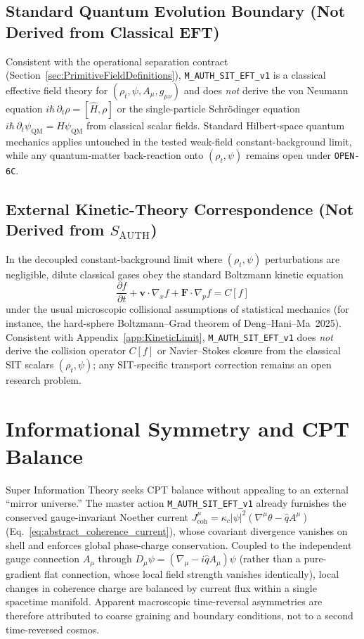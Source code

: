 \subsection{Standard Quantum Evolution Boundary (Not Derived from Classical EFT)}

Consistent with the operational separation contract (Section~\ref{sec:PrimitiveFieldDefinitions}), \texttt{M\_AUTH\_SIT\_EFT\_v1} is a classical effective field theory for $(\rho_t, \psi, A_\mu, g_{\mu\nu})$ and does \emph{not} derive the von Neumann equation $i\hbar\,\partial_t\rho = [\hat{H}, \rho]$ or the single-particle Schr\"odinger equation $i\hbar\,\partial_t\psi_{\mathrm{QM}} = \hat{H}\psi_{\mathrm{QM}}$ from classical scalar fields. Standard Hilbert-space quantum mechanics applies untouched in the tested weak-field constant-background limit, while any quantum-matter back-reaction onto $(\rho_t, \psi)$ remains open under \texttt{OPEN-6C}.

\subsection{External Kinetic-Theory Correspondence (Not Derived from $S_{\mathrm{AUTH}}$)}

In the decoupled constant-background limit where $(\rho_t, \psi)$ perturbations are negligible, dilute classical gases obey the standard Boltzmann kinetic equation
\[
\frac{\partial f}{\partial t} + \mathbf{v} \cdot \nabla_x f + \mathbf{F} \cdot \nabla_p f = C[f]
\]
under the usual microscopic collisional assumptions of statistical mechanics (for instance, the hard-sphere Boltzmann--Grad theorem of Deng--Hani--Ma~2025). Consistent with Appendix~\ref{app:KineticLimit}, \texttt{M\_AUTH\_SIT\_EFT\_v1} does \emph{not} derive the collision operator $C[f]$ or Navier--Stokes closure from the classical SIT scalars $(\rho_t, \psi)$; any SIT-specific transport correction remains an open research problem.

\section{Informational Symmetry and CPT Balance}
\label{sec:CPT-balance}

Super Information Theory seeks CPT balance without appealing to an external ``mirror universe.''  
The master action \texttt{M\_AUTH\_SIT\_EFT\_v1} already furnishes the conserved gauge-invariant Noether current
$J^\mu_{\mathrm{coh}} = \kappa_c|\psi|^2(\nabla^\mu\theta - \hat{q}A^\mu)$ (Eq.~\eqref{eq:abstract_coherence_current}),
whose covariant divergence vanishes on shell and enforces global phase-charge conservation.  
Coupled to the independent gauge connection $A_\mu$ through $D_\mu\psi = (\nabla_\mu - i\hat{q}A_\mu)\psi$ (rather than a pure-gradient flat connection, whose local field strength vanishes identically), local changes in coherence charge are balanced by current flux within a single spacetime manifold.  
Apparent macroscopic time-reversal asymmetries are therefore attributed to coarse graining and boundary conditions,
not to a second time-reversed cosmos.  

